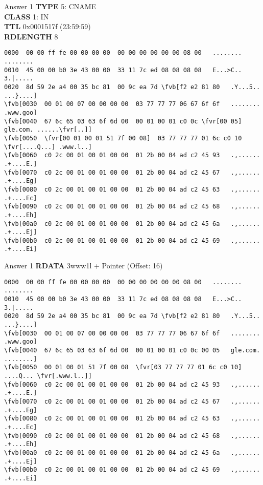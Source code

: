 \documentclass{beamer}
\newcommand*{\fvr}[1]{\textcolor{red}{#1}}
\newcommand*{\fvb}[1]{\textcolor{blue}{#1}}
\begin{document}
  \begin{frame}[fragile]{\mytitle}{Answer 1}
    \textbf{TYPE} 5: CNAME\\
    \textbf{CLASS} 1: IN\\
    \textbf{TTL} 0x0001517f (23:59:59)\\
    \textbf{RDLENGTH} 8\\
    \vfill
    \tiny
    \begin{Verbatim}[commandchars=\\\[\]]
0000  00 00 ff fe 00 00 00 00  00 00 00 00 00 00 08 00   ........ ........
0010  45 00 00 b0 3e 43 00 00  33 11 7c ed 08 08 08 08   E...>C.. 3.|.....
0020  8d 59 2e a4 00 35 bc 81  00 9c ea 7d \fvb[f2 e2 81 80   .Y...5.. ...}....]
\fvb[0030  00 01 00 07 00 00 00 00  03 77 77 77 06 67 6f 6f   ........ .www.goo]
\fvb[0040  67 6c 65 03 63 6f 6d 00  00 01 00 01 c0 0c \fvr[00 05]   gle.com. ......\fvr[..]]
\fvb[0050  \fvr[00 01 00 01 51 7f 00 08]  03 77 77 77 01 6c c0 10   \fvr[....Q...] .www.l..]
\fvb[0060  c0 2c 00 01 00 01 00 00  01 2b 00 04 ad c2 45 93   .,...... .+....E.]
\fvb[0070  c0 2c 00 01 00 01 00 00  01 2b 00 04 ad c2 45 67   .,...... .+....Eg]
\fvb[0080  c0 2c 00 01 00 01 00 00  01 2b 00 04 ad c2 45 63   .,...... .+....Ec]
\fvb[0090  c0 2c 00 01 00 01 00 00  01 2b 00 04 ad c2 45 68   .,...... .+....Eh]
\fvb[00a0  c0 2c 00 01 00 01 00 00  01 2b 00 04 ad c2 45 6a   .,...... .+....Ej]
\fvb[00b0  c0 2c 00 01 00 01 00 00  01 2b 00 04 ad c2 45 69   .,...... .+....Ei]
    \end{Verbatim}
\end{frame}

  \begin{frame}[fragile]{\mytitle}{Answer 1}
    \textbf{RDATA} 3www1l + Pointer (Offset: 16)
    \vfill
    \tiny
    \begin{Verbatim}[commandchars=\\\[\]]
0000  00 00 ff fe 00 00 00 00  00 00 00 00 00 00 08 00   ........ ........
0010  45 00 00 b0 3e 43 00 00  33 11 7c ed 08 08 08 08   E...>C.. 3.|.....
0020  8d 59 2e a4 00 35 bc 81  00 9c ea 7d \fvb[f2 e2 81 80   .Y...5.. ...}....]
\fvb[0030  00 01 00 07 00 00 00 00  03 77 77 77 06 67 6f 6f   ........ .www.goo]
\fvb[0040  67 6c 65 03 63 6f 6d 00  00 01 00 01 c0 0c 00 05   gle.com. ........]
\fvb[0050  00 01 00 01 51 7f 00 08  \fvr[03 77 77 77 01 6c c0 10]   ....Q... \fvr[.www.l..]]
\fvb[0060  c0 2c 00 01 00 01 00 00  01 2b 00 04 ad c2 45 93   .,...... .+....E.]
\fvb[0070  c0 2c 00 01 00 01 00 00  01 2b 00 04 ad c2 45 67   .,...... .+....Eg]
\fvb[0080  c0 2c 00 01 00 01 00 00  01 2b 00 04 ad c2 45 63   .,...... .+....Ec]
\fvb[0090  c0 2c 00 01 00 01 00 00  01 2b 00 04 ad c2 45 68   .,...... .+....Eh]
\fvb[00a0  c0 2c 00 01 00 01 00 00  01 2b 00 04 ad c2 45 6a   .,...... .+....Ej]
\fvb[00b0  c0 2c 00 01 00 01 00 00  01 2b 00 04 ad c2 45 69   .,...... .+....Ei]
    \end{Verbatim}
\end{frame}
\end{document}
